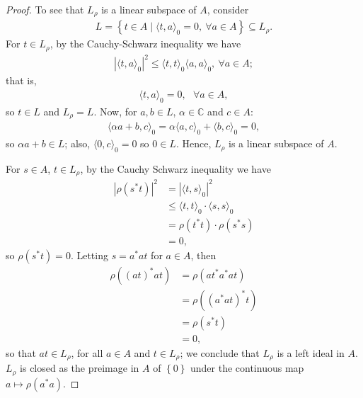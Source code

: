\documentclass[11pt,a4paper]{report}
\theoremstyle{plain}
\theoremstyle{definition}
\newcommand{\1}{\mathbbm{1}}
\begin{document}
\begin{proof}
	To see that $L_\rho$ is a linear subspace of $A$, consider 
	\begin{align*}
		L= \left\{t \in A  \mid \langle t,a \rangle _0 = 0,
				~\forall a \in A \right\} \subseteq L_\rho.
	\end{align*}
	For $t \in L_\rho$, by the Cauchy-Schwarz inequality we have 
	\begin{align*} 
		|\langle t,a \rangle_0|^2 \leq \langle t,t \rangle_0 \langle a,a\rangle_0,
				~ \forall a \in A;
	\end{align*}
	that is,
	\begin{align*}
		\langle t,a \rangle _0 = 0, ~~~ \forall a \in A,
	\end{align*}
	so $t\in L$ and $L_\rho =L$.
	Now, for $a,b \in L$, $\alpha \in \mathbb{C}$ and $c \in A$:
	\begin{align*}
		\langle \alpha a + b, c \rangle _0 = \alpha \langle a,c \rangle _0 + 
						\langle b,c\rangle _0 = 0,
	\end{align*}
	so $\alpha a +b \in L$; also, $\langle 0,c\rangle _0 = 0$ so $0 \in L$. 
	Hence, $L_\rho  $ is a linear subspace of $A$.
	
	For $s \in A$, $t\in L_\rho$, by the Cauchy Schwarz inequality we have 
	\begin{align*}
		|\rho (s^\ast t) |^2 	
		&= 		|\langle t,s\rangle_0 |^2 												\\
		&\leq 	\langle t,t\rangle_0 \cdot \langle s,s\rangle_0  						\\
		&= 		\rho (t^\ast t) \cdot \rho (s^\ast s)									\\
		&=		0,
	\end{align*}
	so $\rho (s^\ast t) = 0$. Letting $s = a^\ast a t$ for $a \in A$, then
	\begin{align*}
		\rho ((at)^\ast at) 
		&= 		\rho (at^\ast a^\ast at) 												\\
		&= 		\rho ((a^\ast at)^\ast t) 												\\
		&= 		\rho (s^\ast t) 														\\
		&=		0,
	\end{align*}
	so that $at \in L_\rho$, for all $a \in A$ and $t \in L_\rho$; we conclude that 
	$L_\rho$ is a left ideal in $A$. $L_\rho$ is closed as the preimage in $A$ of 
	$\left\{0\right\}$ under the continuous map $a \mapsto \rho (a^\ast a)$. 


\end{proof}
\end{document}
